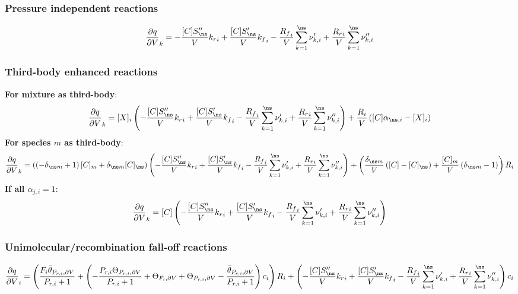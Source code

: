 \documentclass[a4paper,10pt]{article}
\begin{document}
\subsubsection{Pressure independent reactions}
\begin{dmath} \frac{\partial q }{\partial V }_{k} = - \frac{[C] S^{\prime\prime}_{\ns}}{V} {k_r}_{i} + \frac{[C] S^{\prime}_{\ns}}{V} {k_f}_{i} - \frac{{R_f}_{i}}{V} \sum_{k=1}^{\ns} \nu^{\prime}_{k,i} + \frac{{R_r}_{i}}{V} \sum_{k=1}^{\ns} \nu^{\prime\prime}_{k,i}\end{dmath} 
\subsubsection{Third-body enhanced reactions}
\textbf{For mixture as third-body}:
\begin{dmath} \frac{\partial q }{\partial V }_{k} = [X]_{i} \left(- \frac{[C] S^{\prime\prime}_{\ns}}{V} {k_r}_{i} + \frac{[C] S^{\prime}_{\ns}}{V} {k_f}_{i} - \frac{{R_f}_{i}}{V} \sum_{k=1}^{\ns} \nu^{\prime}_{k,i} + \frac{{R_r}_{i}}{V} \sum_{k=1}^{\ns} \nu^{\prime\prime}_{k,i}\right) + \frac{R_{i}}{V} \left([C] \alpha_{\ns,i} - [X]_{i}\right)\end{dmath} 
\textbf{For species $m$ as third-body}:
\begin{dmath} \frac{\partial q }{\partial V }_{k} = \left(\left(- \delta_{\ns m} + 1\right) [C]_{m} + \delta_{\ns m} [C]_{\ns}\right) \left(- \frac{[C] S^{\prime\prime}_{\ns}}{V} {k_r}_{i} + \frac{[C] S^{\prime}_{\ns}}{V} {k_f}_{i} - \frac{{R_f}_{i}}{V} \sum_{k=1}^{\ns} \nu^{\prime}_{k,i} + \frac{{R_r}_{i}}{V} \sum_{k=1}^{\ns} \nu^{\prime\prime}_{k,i}\right) + \left(\frac{\delta_{\ns m}}{V} \left([C] - [C]_{\ns}\right) + \frac{[C]_{m}}{V} \left(\delta_{\ns m} - 1\right)\right) R_{i}\end{dmath} 
\textbf{If all $\alpha_{j,i} = 1$}:
\begin{dmath} \frac{\partial q }{\partial V }_{k} = [C] \left(- \frac{[C] S^{\prime\prime}_{\ns}}{V} {k_r}_{i} + \frac{[C] S^{\prime}_{\ns}}{V} {k_f}_{i} - \frac{{R_f}_{i}}{V} \sum_{k=1}^{\ns} \nu^{\prime}_{k,i} + \frac{{R_r}_{i}}{V} \sum_{k=1}^{\ns} \nu^{\prime\prime}_{k,i}\right)\end{dmath} 
\subsubsection{Unimolecular/recombination fall-off reactions}
\begin{dmath} \frac{\partial q }{\partial V }_{i} = \left(\frac{F_{i} \bar{\theta}_{P_{r, i}, \partial V}}{P_{r, i} + 1} + \left(- \frac{P_{r, i} \Theta_{P_{r,i}, \partial V}}{P_{r, i} + 1} + \Theta_{F_i, \partial V} + \Theta_{P_{r,i}, \partial V} - \frac{\bar{\theta}_{P_{r, i}, \partial V}}{P_{r, i} + 1}\right) c_{i}\right) R_{i} + \left(- \frac{[C] S^{\prime\prime}_{\ns}}{V} {k_r}_{i} + \frac{[C] S^{\prime}_{\ns}}{V} {k_f}_{i} - \frac{{R_f}_{i}}{V} \sum_{k=1}^{\ns} \nu^{\prime}_{k,i} + \frac{{R_r}_{i}}{V} \sum_{k=1}^{\ns} \nu^{\prime\prime}_{k,i}\right) c_{i}\end{dmath} 
\end{document}

